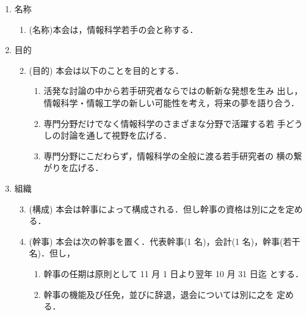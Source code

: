 \maketitle
%
\begin{enumerate}
%
\item 名称\\
%
\begin{enumerate}
\item (名称)本会は，情報科学若手の会と称する．\\
\end{enumerate}
%
\item	目的\\
%
\begin{enumerate}
\setcounter{enumii}{1}
\item \label{mokuteki} (目的) 本会は以下のことを目的とする．\\

	\begin{enumerate}
	\item	活発な討論の中から若手研究者ならではの斬新な発想を生み
出し，情報科学・情報工学の新しい可能性を考え，将来の夢を語り合う．\\
	\item	専門分野だけでなく情報科学のさまざまな分野で活躍する若
手どうしの討論を通して視野を広げる．\\
	\item	専門分野にこだわらず，情報科学の全般に渡る若手研究者の
横の繋がりを広げる．\\
	\end{enumerate}
%
\end{enumerate}
%
\item	組織\\
\begin{enumerate}
\setcounter{enumii}{2}
\item	(構成) 本会は幹事によって構成される．但し幹事の資格は別に之を定める．\\
%
\item	(幹事) 本会は次の幹事を置く．代表幹事(1 名)，会計(1 名)，幹事(若干 
名)．但し，\\
\begin{enumerate}
	\item	幹事の任期は原則として 11 月 1 日より翌年 10 月 31 日迄
とする．\\
	\item	幹事の機能及び任免，並びに辞退，退会については別に之を
定める．\\
\end{enumerate}
%


\end{enumerate}
\end{enumerate}
